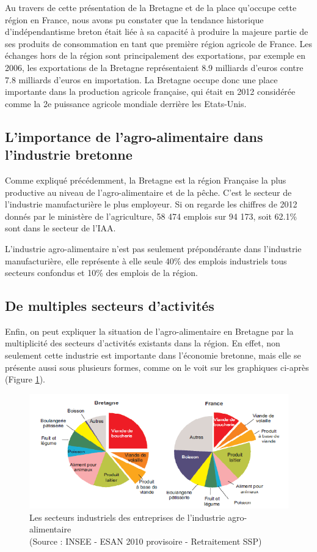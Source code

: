\documentclass[a4paper,12pt]{report}
\begin{document}
			Au travers de cette présentation de la Bretagne et de la place qu’occupe cette région en France, nous avons pu constater que la tendance historique d’indépendantisme breton était liée à sa capacité à produire la majeure partie de ses produits de consommation en tant que première région agricole de France. Les échanges hors de la région sont principalement des exportations, par exemple en 2006, les exportations de la Bretagne représentaient 8.9 milliards d’euros contre 7.8 milliards d’euros en importation. La Bretagne occupe donc une place importante dans la production agricole française, qui était en 2012 considérée comme la 2e puissance agricole mondiale derrière les Etats-Unis.
			
	
		\subsection{L'importance de l'agro-alimentaire dans l'industrie bretonne}
			Comme expliqué précédemment, la Bretagne est la région Française la plus productive au niveau de l’agro-alimentaire et de la pêche\cite{ChiffresCCI}. C’est le secteur de l’industrie manufacturière le plus employeur. Si on regarde les chiffres de 2012 donnés par le ministère de l’agriculture, 58 474 emplois sur 94 173, soit 62.1\% sont dans le secteur de l’IAA.
			
			L’industrie agro-alimentaire n’est pas seulement prépondérante dans l’industrie manufacturière, elle représente à elle seule 40\% des emplois industriels tous secteurs confondus et 10\% des emplois de la région\cite{OuEnEstIAABretonne}.
			
		\subsection{De multiples secteurs d'activités}
			Enfin, on peut expliquer la situation de l'agro-alimentaire en Bretagne par la multiplicité des secteurs d'activités existants dans la région. En effet, non seulement cette industrie est importante dans l'économie bretonne, mais elle se présente aussi sous plusieurs formes, comme on le voit sur les graphiques ci-après (Figure \ref{SecteursIndustrielsIAA}).
			
			\begin{figure}[!h]
			\centering
			\includegraphics[scale=1]{Illustrations/SecteursIndustrielsIAA.png}
			\caption{Les secteurs industriels des entreprises de l'industrie agro-alimentaire\\(Source : INSEE - ESAN 2010 provisoire - Retraitement SSP)}
			\label{SecteursIndustrielsIAA}
			\end{figure}
			
\end{document}
